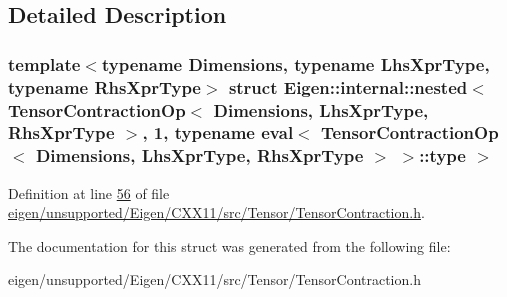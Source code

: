 \subsection{Detailed Description}
\subsubsection*{template$<$typename Dimensions, typename Lhs\+Xpr\+Type, typename Rhs\+Xpr\+Type$>$\newline
struct Eigen\+::internal\+::nested$<$ Tensor\+Contraction\+Op$<$ Dimensions, Lhs\+Xpr\+Type, Rhs\+Xpr\+Type $>$, 1, typename eval$<$ Tensor\+Contraction\+Op$<$ Dimensions, Lhs\+Xpr\+Type, Rhs\+Xpr\+Type $>$ $>$\+::type $>$}



Definition at line \hyperlink{eigen_2unsupported_2_eigen_2_c_x_x11_2src_2_tensor_2_tensor_contraction_8h_source_l00056}{56} of file \hyperlink{eigen_2unsupported_2_eigen_2_c_x_x11_2src_2_tensor_2_tensor_contraction_8h_source}{eigen/unsupported/\+Eigen/\+C\+X\+X11/src/\+Tensor/\+Tensor\+Contraction.\+h}.



The documentation for this struct was generated from the following file\+:\begin{DoxyCompactItemize}
\item 
eigen/unsupported/\+Eigen/\+C\+X\+X11/src/\+Tensor/\+Tensor\+Contraction.\+h\end{DoxyCompactItemize}
